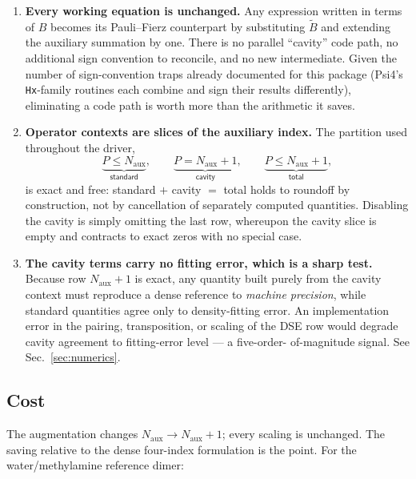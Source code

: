 \documentclass[11pt]{article}
\newcommand{\naux}{N_{\mathrm{aux}}}
\begin{document}
\begin{enumerate}[leftmargin=*, itemsep=4pt]

\item \textbf{Every working equation is unchanged.} Any expression written in
terms of $B$ becomes its Pauli--Fierz counterpart by substituting $\tilde{B}$
and extending the auxiliary summation by one. There is no parallel ``cavity''
code path, no additional sign convention to reconcile, and no new intermediate.
Given the number of sign-convention traps already documented for this package
(Psi4's \texttt{Hx}-family routines each combine and sign their results
differently), eliminating a code path is worth more than the arithmetic it
saves.

\item \textbf{Operator contexts are slices of the auxiliary index.} The
partition used throughout the driver,
\begin{equation}
\underbrace{P \le \naux}_{\textsf{standard}}, \qquad
\underbrace{P = \naux+1}_{\textsf{cavity}}, \qquad
\underbrace{P \le \naux+1}_{\textsf{total}},
\label{eq:contexts}
\end{equation}
is exact and free: \textsf{standard} $+$ \textsf{cavity} $=$ \textsf{total}
holds to roundoff by construction, not by cancellation of separately computed
quantities. Disabling the cavity is simply omitting the last row, whereupon the
\textsf{cavity} slice is empty and contracts to exact zeros with no special
case.

\item \textbf{The cavity terms carry no fitting error, which is a sharp test.}
Because row $\naux+1$ is exact, any quantity built purely from the
\textsf{cavity} context must reproduce a dense reference to \emph{machine
precision}, while \textsf{standard} quantities agree only to density-fitting
error. An implementation error in the pairing, transposition, or scaling of the
DSE row would degrade cavity agreement to fitting-error level --- a five-order-%
of-magnitude signal. See Sec.~\ref{sec:numerics}.

\end{enumerate}

\subsection{Cost}

The augmentation changes $\naux \to \naux + 1$; every scaling is unchanged.
The saving relative to the dense four-index formulation is the point. For the
water/methylamine reference dimer:
\end{document}
